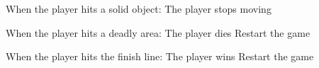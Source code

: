 \begin{verbatimtab}
When the player hits a solid object:
  The player stops moving

When the player hits a deadly area:
  The player dies
  Restart the game

When the player hits the finish line:
  The player wins
  Restart the game
\end{verbatimtab}
